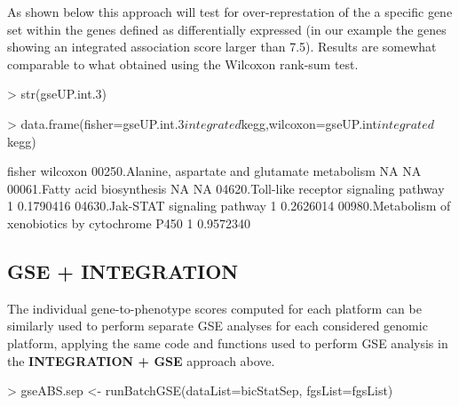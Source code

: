 \documentclass[11pt]{article}
\begin{document}
As shown below this approach will test for over-represtation of the
a specific gene set within the genes defined as differentially expressed
(in our example the genes showing an integrated association score
larger than 7.5). Results are somewhat comparable to what obtained
using the Wilcoxon rank-sum test.

\begin{Schunk}
\begin{Sinput}
> str(gseUP.int.3)
\end{Sinput}
\begin{Sinput}
> data.frame(fisher=gseUP.int.3$integrated$kegg,wilcoxon=gseUP.int$integrated$kegg)
\end{Sinput}
\begin{Soutput}
                                                   fisher  wilcoxon
00250.Alanine, aspartate and glutamate metabolism      NA        NA
00061.Fatty acid biosynthesis                          NA        NA
04620.Toll-like receptor signaling pathway              1 0.1790416
04630.Jak-STAT signaling pathway                        1 0.2626014
00980.Metabolism of xenobiotics by cytochrome P450      1 0.9572340
\end{Soutput}
\end{Schunk}

\subsection{GSE + INTEGRATION}
The individual gene-to-phenotype scores computed for each platform
can be similarly used to perform separate GSE analyses for each considered
genomic platform, applying the same code and functions used to perform
GSE analysis in the {\bf INTEGRATION + GSE} approach above.

\begin{Schunk}
\begin{Sinput}
> gseABS.sep <- runBatchGSE(dataList=bicStatSep, fgsList=fgsList)
\end{Sinput}
\end{Schunk}
\end{document}
